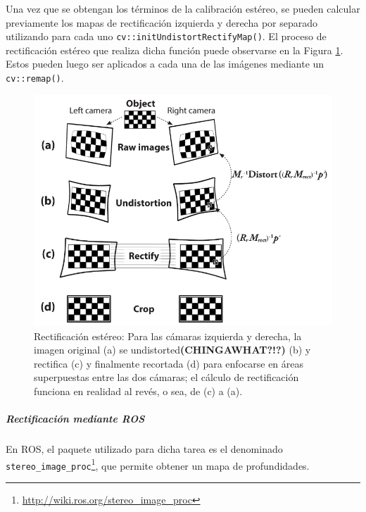 Una vez que se obtengan los términos de la calibración estéreo, se pueden calcular previamente los mapas de rectificación izquierda y derecha por separado utilizando para cada uno \texttt{cv::initUndistortRectifyMap()}. El proceso de rectificación estéreo que realiza dicha función puede observarse en la Figura \ref{fig:stereorectification}. Estos pueden luego ser aplicados a cada una de las imágenes mediante un \texttt{cv::remap()}.
\begin{figure}
    \centering
    \includegraphics[width=\textwidth]{Img/StereoRectification.png}
    \caption{Rectificación estéreo: Para las cámaras izquierda y derecha, la imagen original (a) se undistorted\textbf{(CHINGAWHAT?!?)} (b) y rectifica (c) y finalmente recortada (d) para enfocarse en áreas superpuestas entre las dos cámaras; el cálculo de rectificación funciona en realidad al revés, o sea, de (c) a (a).}
    \label{fig:stereorectification}
\end{figure}

\subparagraph{Rectificación mediante ROS}
En ROS, el paquete utilizado para dicha tarea es el denominado \texttt{stereo\_image\_proc}\footnote{\url{http://wiki.ros.org/stereo_image_proc}}, que permite obtener un mapa de profundidades.

